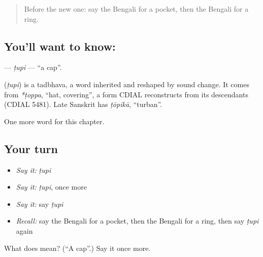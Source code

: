 \label{lesson:BN-C85-tupi}



\begin{quote}
Before the new one: say the Bengali for a pocket, then the Bengali for a ring.
\end{quote}

\subsection*{You'll want to know: }
\textbf{} — \emph{ṭupi} — \textquotedblleft{}a cap\textquotedblright{}.

\begin{cousinweb}
\textbf{} (\emph{ṭupi}) is a tadbhava, a word inherited and reshaped by sound change. It comes from \emph{*ṭoppa}, \textquotedblleft{}hat, covering\textquotedblright{}, a form CDIAL reconstructs from its descendants (CDIAL 5481). Late Sanskrit has \emph{ṭōpikā}, \textquotedblleft{}turban\textquotedblright{}.
\end{cousinweb}

\begin{grammarlens}[title={What you've built}]
One more word for this chapter.
\end{grammarlens}

\subsection*{Your turn}
\begin{itemize}
\raggedright
  \item \emph{Say it:} \emph{ṭupi}
  \item \emph{Say it:} \emph{ṭupi}, once more
  \item \emph{Say it:} say \emph{ṭupi}
  \item \emph{Recall:} say the Bengali for a pocket, then the Bengali for a ring, then say \emph{ṭupi} again
\end{itemize}

\begin{tcolorbox}[breakable,colback=teal!4,colframe=teal!35!black,title={Before you move on}]
What does  mean? (\textquotedblleft{}A cap\textquotedblright{}.) Say it once more.
\end{tcolorbox}
